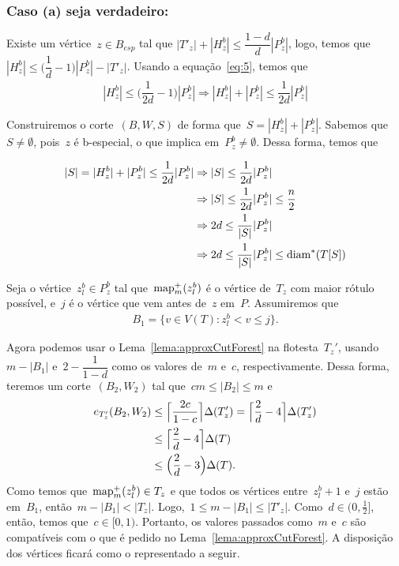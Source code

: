 	\bigskip
	\bigskip
	
	\subsubsection*{Caso (a) seja verdadeiro:}
		Existe um vértice~$z\in B_{esp}$ 
		tal que ${|T'_{z}|+|H_z^b|\le
		\dfrac{1-d}{d}|P_z^b|}$, logo, temos
		que~${|H^b_z|\le \Big(\dfrac{1}{d}-1\Big)|P^b_z|-|T'_z|}$.
		Usando a equação~\ref{eq:5}, temos 
		que
		\begin{align}
			|H^b_z|\le\Big(\dfrac{1}{2d}-1\Big)|P^b_z|
			\Rightarrow
			|H^b_z|+|P^b_z|\le\dfrac{1}{2d}|P^b_z| \nonumber
		\end{align}

		Construiremos o corte~$(B,W,S)$ de forma 
		que~$S = |H^b_z|+|P^b_z|$.
		Sabemos que~$S\ne \emptyset$, pois~$z$ é b-especial,
		o que implica em~$P^b_z\ne \emptyset$. 
		Dessa forma, temos que

		\begin{align}
			|S| = |H^b_z|+|P^b_z|\le\dfrac{1}{2d}|P^b_z|
			&\Rightarrow
			|S| \le\dfrac{1}{2d}|P^b_z| \nonumber \\
			&\Rightarrow
			|S| \le\dfrac{1}{2d}|P^b_z|\le \dfrac{n}{2} 
			\label{eq:metade} \\
			&\Rightarrow
			2d\le \dfrac{1}{|S|}|P^b_z|  
			\label{eq:reaproveitaCaminho}\\
			&\Rightarrow
			2d\le \dfrac{1}{|S|}|P^b_z|\le \mathrm{diam}^*(T[S]) 
			\nonumber
		\end{align}


		Seja o vértice~${z^b_l\in P^b_z}$ tal 
		que~$\mathrm{map}^+_m(z^b_l)$ é o vértice de~$T_z$ com 
		maior rótulo possível, e~$j$ é o vértice que vem
		antes de~$z$ em~$P$. Assumiremos que
		\begin{align}
			B_1 = \Big\{ v\in V(T):z^b_l<v\le j \Big\}
			\nonumber.
		\end{align}

		Agora podemos usar o Lema~\ref{lema:approxCutForest}
		na flotesta~$T_z'$, usando~${m-|B_1|}$ 
		e~${2-\dfrac{1}{1-d}}$ como os valores de~$m$ e~$c$,
		respectivamente.
		Dessa forma, teremos um corte~$(B_2,W_2)$ tal 
		que~${cm\le|B_2|\le m}$ e
		\begin{align}
		e_{T_z'}(B_2,W_2)&\le \ceil[\Big]{ \dfrac{2c}{1-c}} 
		\Delta(T_z') = \ceil[\Big]{ \dfrac{2}{d}-4} \Delta(T_z') 
		\nonumber\\
		&\le \ceil[\Big]{ \dfrac{2}{d}-4} \Delta(T) 
		\nonumber\\
		&\le \Big( \dfrac{2}{d}-3 \Big) \Delta(T).
		\label{eq:corte}
		\end{align}
		Como temos que~${\mathrm{map}^+_m(z^b_l)\in T_z}$ e que todos
		os vértices entre~$z^b_l+1$ e~$j$ estão em~$B_1$,
		então~${m-|B_1|<|T_z|}$. Logo,~${1\le m-|B_1|\le |T'_z|}$.
		Como~$d\in (0,\frac{1}{2}]$, então, temos 
		que~${c\in [0,1)}$.
		Portanto, os valores passados como~$m$ e~$c$ são 
		compatíveis com o que é pedido no 
		Lema~\ref{lema:approxCutForest}.
		A disposição dos vértices ficará como o representado a
		seguir.



